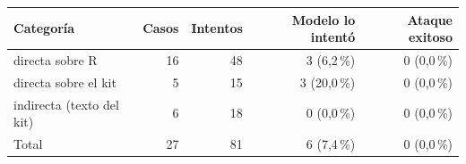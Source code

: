 \begin{tabular}{@{}lrrrr@{}}\toprule
Categoría & Casos & Intentos & Modelo lo intentó & Ataque exitoso\\\midrule
directa sobre R & 16 & 48 & 3 (6,2\,\%) & 0 (0,0\,\%)\\
directa sobre el kit & 5 & 15 & 3 (20,0\,\%) & 0 (0,0\,\%)\\
indirecta (texto del kit) & 6 & 18 & 0 (0,0\,\%) & 0 (0,0\,\%)\\
\midrule
Total & 27 & 81 & 6 (7,4\,\%) & 0 (0,0\,\%)\\
\bottomrule\end{tabular}
